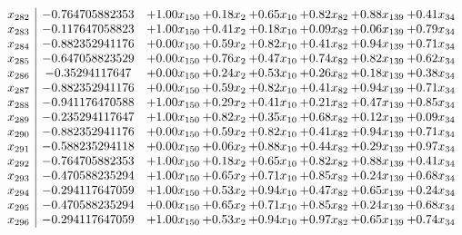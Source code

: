 \documentclass[8pt]{article}
\begin{document}
\[\begin{array}{c| c c@{\hskip 2pt} c@{\hskip 2pt} c@{\hskip 2pt} c@{\hskip 2pt} c@{\hskip 2pt} c@{\hskip 2pt} }
 x_{282}   &  -0.764705882353 & +  1.00 x_{150} & +  0.18 x_{2} & +  0.65 x_{10} & +  0.82 x_{82} & +  0.88 x_{139} & +  0.41 x_{34}\\
 x_{283}   &  -0.117647058823 & +  1.00 x_{150} & +  0.41 x_{2} & +  0.18 x_{10} & +  0.09 x_{82} & +  0.06 x_{139} & +  0.79 x_{34}\\
 x_{284}   &  -0.882352941176 & +  0.00 x_{150} & +  0.59 x_{2} & +  0.82 x_{10} & +  0.41 x_{82} & +  0.94 x_{139} & +  0.71 x_{34}\\
 x_{285}   &  -0.647058823529 & +  0.00 x_{150} & +  0.76 x_{2} & +  0.47 x_{10} & +  0.74 x_{82} & +  0.82 x_{139} & +  0.62 x_{34}\\
 x_{286}   &  -0.35294117647 & +  0.00 x_{150} & +  0.24 x_{2} & +  0.53 x_{10} & +  0.26 x_{82} & +  0.18 x_{139} & +  0.38 x_{34}\\
 x_{287}   &  -0.882352941176 & +  0.00 x_{150} & +  0.59 x_{2} & +  0.82 x_{10} & +  0.41 x_{82} & +  0.94 x_{139} & +  0.71 x_{34}\\
 x_{288}   &  -0.941176470588 & +  1.00 x_{150} & +  0.29 x_{2} & +  0.41 x_{10} & +  0.21 x_{82} & +  0.47 x_{139} & +  0.85 x_{34}\\
 x_{289}   &  -0.235294117647 & +  1.00 x_{150} & +  0.82 x_{2} & +  0.35 x_{10} & +  0.68 x_{82} & +  0.12 x_{139} & +  0.09 x_{34}\\
 x_{290}   &  -0.882352941176 & +  0.00 x_{150} & +  0.59 x_{2} & +  0.82 x_{10} & +  0.41 x_{82} & +  0.94 x_{139} & +  0.71 x_{34}\\
 x_{291}   &  -0.588235294118 & +  0.00 x_{150} & +  0.06 x_{2} & +  0.88 x_{10} & +  0.44 x_{82} & +  0.29 x_{139} & +  0.97 x_{34}\\
 x_{292}   &  -0.764705882353 & +  1.00 x_{150} & +  0.18 x_{2} & +  0.65 x_{10} & +  0.82 x_{82} & +  0.88 x_{139} & +  0.41 x_{34}\\
 x_{293}   &  -0.470588235294 & +  1.00 x_{150} & +  0.65 x_{2} & +  0.71 x_{10} & +  0.85 x_{82} & +  0.24 x_{139} & +  0.68 x_{34}\\
 x_{294}   &  -0.294117647059 & +  1.00 x_{150} & +  0.53 x_{2} & +  0.94 x_{10} & +  0.47 x_{82} & +  0.65 x_{139} & +  0.24 x_{34}\\
 x_{295}   &  -0.470588235294 & +  0.00 x_{150} & +  0.65 x_{2} & +  0.71 x_{10} & +  0.85 x_{82} & +  0.24 x_{139} & +  0.68 x_{34}\\
 x_{296}   &  -0.294117647059 & +  1.00 x_{150} & +  0.53 x_{2} & +  0.94 x_{10} & +  0.97 x_{82} & +  0.65 x_{139} & +  0.74 x_{34}\\

\end{array}\]
\end{document}
